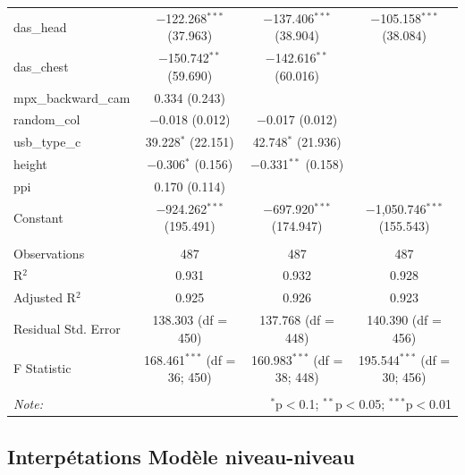 \documentclass[
  12pt,
]{report}
\begin{document}
\begin{table}[!htbp]
\begin{tabular}{@{\extracolsep{5pt}}lccc}
  das\_head & $-$122.268$^{***}$ (37.963) & $-$137.406$^{***}$ (38.904) & $-$105.158$^{***}$ (38.084) \\ 
  das\_chest & $-$150.742$^{**}$ (59.690) & $-$142.616$^{**}$ (60.016) &  \\ 
  mpx\_backward\_cam & 0.334 (0.243) &  &  \\ 
  random\_col & $-$0.018 (0.012) & $-$0.017 (0.012) &  \\ 
  usb\_type\_c & 39.228$^{*}$ (22.151) & 42.748$^{*}$ (21.936) &  \\ 
  height & $-$0.306$^{*}$ (0.156) & $-$0.331$^{**}$ (0.158) &  \\ 
  ppi & 0.170 (0.114) &  &  \\ 
  Constant & $-$924.262$^{***}$ (195.491) & $-$697.920$^{***}$ (174.947) & $-$1,050.746$^{***}$ (155.543) \\ 
 \hline \\[-1.8ex] 
Observations & 487 & 487 & 487 \\ 
R$^{2}$ & 0.931 & 0.932 & 0.928 \\ 
Adjusted R$^{2}$ & 0.925 & 0.926 & 0.923 \\ 
Residual Std. Error & 138.303 (df = 450) & 137.768 (df = 448) & 140.390 (df = 456) \\ 
F Statistic & 168.461$^{***}$ (df = 36; 450) & 160.983$^{***}$ (df = 38; 448) & 195.544$^{***}$ (df = 30; 456) \\ 
\hline 
\hline \\[-1.8ex] 
\textit{Note:}  & \multicolumn{3}{r}{$^{*}$p$<$0.1; $^{**}$p$<$0.05; $^{***}$p$<$0.01} \\ 
\end{tabular} 
\end{table}

\newpage

\subsection{Interpétations Modèle
niveau-niveau}\label{interpuxe9tations-moduxe8le-niveau-niveau}
\end{document}
